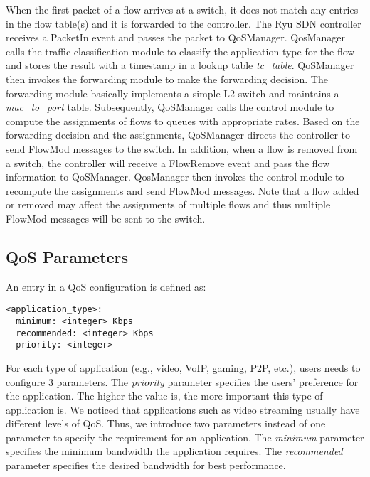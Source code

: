When the first packet of a flow arrives at a switch, it does not match any entries in the flow table(s) and
it is forwarded to the controller. The Ryu SDN controller receives a \textsf{PacketIn} event and passes the
packet to QoSManager. QosManager calls the traffic classification module to classify the application type for
the flow and stores the result with a timestamp in a lookup table \emph{tc\_table}. QoSManager then invokes
the forwarding module to make the forwarding decision. The forwarding module basically implements a simple L2
switch and maintains a \emph{mac\_to\_port} table. Subsequently, QoSManager calls the control module to compute
the assignments of flows to queues with appropriate rates. Based on the forwarding decision and the assignments,
QoSManager directs the controller to send \textsf{FlowMod} messages to the switch. In addition, when a flow is
removed from a switch, the controller will receive a \textsf{FlowRemove} event and pass the flow information to
QoSManager. QosManager then invokes the control module to recompute the assignments and send \textsf{FlowMod}
messages. Note that a flow added or removed may affect the assignments of multiple flows and thus multiple
\textsf{FlowMod} messages will be sent to the switch. 

\subsection{QoS Parameters}
\label{sect:qosParams}

An entry in a QoS configuration is defined as:

\begin{lstlisting}[basicstyle=\sffamily]
<application_type>:
  minimum: <integer> Kbps
  recommended: <integer> Kbps
  priority: <integer>
\end{lstlisting}

For each type of application (e.g., video, VoIP, gaming, P2P, etc.), users needs to configure 3 parameters. The \emph{priority}
parameter specifies the users' preference for the application. The higher the value is, the more important this type of
application is. We noticed that applications such as video streaming usually have different levels of QoS. Thus, we introduce two
parameters instead of one parameter to specify the requirement for an application. The \emph{minimum} parameter specifies
the minimum bandwidth the application requires. The \emph{recommended} parameter specifies the desired bandwidth for best
performance. 


